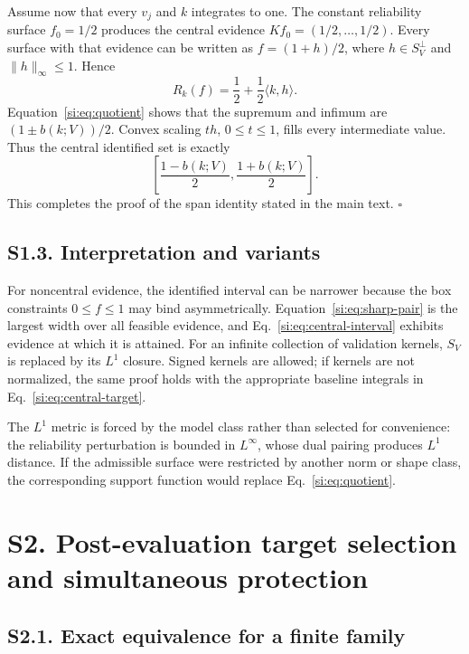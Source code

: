 Assume now that every $v_j$ and $k$ integrates to one. The constant reliability surface $f_0=1/2$ produces the central evidence $Kf_0=(1/2,\ldots,1/2)$. Every surface with that evidence can be written as $f=(1+h)/2$, where $h\in S_V^\perp$ and $\|h\|_\infty\le1$. Hence
\begin{equation}
R_k(f)=\frac12+\frac12\langle k,h\rangle.
\label{si:eq:central-target}
\end{equation}
Equation~\ref{si:eq:quotient} shows that the supremum and infimum are $(1\pm b(k;V))/2$. Convex scaling $th$, $0\le t\le1$, fills every intermediate value. Thus the central identified set is exactly
\begin{equation}
\left[\frac{1-b(k;V)}2,\frac{1+b(k;V)}2\right].
\label{si:eq:central-interval}
\end{equation}
This completes the proof of the span identity stated in the main text. \hfill$\square$

\subsection*{S1.3. Interpretation and variants}

For noncentral evidence, the identified interval can be narrower because the box constraints $0\le f\le1$ may bind asymmetrically. Equation~\ref{si:eq:sharp-pair} is the largest width over all feasible evidence, and Eq.~\ref{si:eq:central-interval} exhibits evidence at which it is attained. For an infinite collection of validation kernels, $S_V$ is replaced by its $L^1$ closure. Signed kernels are allowed; if kernels are not normalized, the same proof holds with the appropriate baseline integrals in Eq.~\ref{si:eq:central-target}.

The $L^1$ metric is forced by the model class rather than selected for convenience: the reliability perturbation is bounded in $L^\infty$, whose dual pairing produces $L^1$ distance. If the admissible surface were restricted by another norm or shape class, the corresponding support function would replace Eq.~\ref{si:eq:quotient}.

\section*{S2. Post-evaluation target selection and simultaneous protection}

\subsection*{S2.1. Exact equivalence for a finite family}

